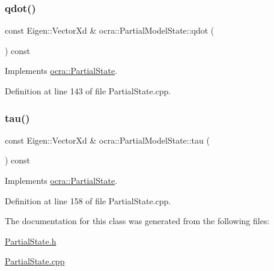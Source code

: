 \subsubsection{\texorpdfstring{qdot()}{qdot()}}
{\footnotesize\ttfamily const Eigen\+::\+Vector\+Xd \& ocra\+::\+Partial\+Model\+State\+::qdot (\begin{DoxyParamCaption}{ }\end{DoxyParamCaption}) const\hspace{0.3cm}{\ttfamily [virtual]}}



Implements \hyperlink{classocra_1_1PartialState_a5af623db2ae7e68cb4658f226e8ae006}{ocra\+::\+Partial\+State}.



Definition at line 143 of file Partial\+State.\+cpp.

\hypertarget{classocra_1_1PartialModelState_a286258284aa61c902106a6b0fcdde9ca}{}\label{classocra_1_1PartialModelState_a286258284aa61c902106a6b0fcdde9ca} 
\subsubsection{\texorpdfstring{tau()}{tau()}}
{\footnotesize\ttfamily const Eigen\+::\+Vector\+Xd \& ocra\+::\+Partial\+Model\+State\+::tau (\begin{DoxyParamCaption}{ }\end{DoxyParamCaption}) const\hspace{0.3cm}{\ttfamily [virtual]}}



Implements \hyperlink{classocra_1_1PartialState_a875575d215c7fe9278d47ff6f392bb84}{ocra\+::\+Partial\+State}.



Definition at line 158 of file Partial\+State.\+cpp.



The documentation for this class was generated from the following files\+:\begin{DoxyCompactItemize}
\item 
\hyperlink{PartialState_8h}{Partial\+State.\+h}\item 
\hyperlink{PartialState_8cpp}{Partial\+State.\+cpp}\end{DoxyCompactItemize}

